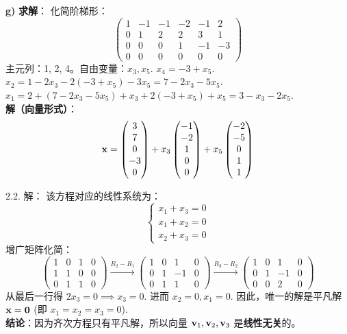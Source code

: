 \begin{exer}
\textbf{g)}
\textbf{求解}：
化简阶梯形：
$$ \left(\begin{array}{ccccc|c} 1 & -1 & -1 & -2 & -1 & 2 \\ 0 & 1 & 2 & 2 & 3 & 1 \\ 0 & 0 & 0 & 1 & -1 & -3 \\ 0 & 0 & 0 & 0 & 0 & 0 \end{array}\right) $$
主元列：1, 2, 4。自由变量：$x_3, x_5$.
$x_4 = -3 + x_5$.
$x_2 = 1 - 2x_3 - 2(-3+x_5) - 3x_5 = 7 - 2x_3 - 5x_5$.
$x_1 = 2 + (7-2x_3-5x_5) + x_3 + 2(-3+x_5) + x_5 = 3 - x_3 - 2x_5$.
\\
\textbf{解（向量形式）}：
$$ \mathbf{x} = \begin{pmatrix} 3 \\ 7 \\ 0 \\ -3 \\ 0 \end{pmatrix} + x_3 \begin{pmatrix} -1 \\ -2 \\ 1 \\ 0 \\ 0 \end{pmatrix} + x_5 \begin{pmatrix} -2 \\ -5 \\ 0 \\ 1 \\ 1 \end{pmatrix} $$

2.2. 解：
该方程对应的线性系统为：
$$ \begin{cases} x_1 + x_3 = 0 \\ x_1 + x_2 = 0 \\ x_2 + x_3 = 0 \end{cases} $$
增广矩阵化简：
$$ \left(\begin{array}{ccc|c} 1 & 0 & 1 & 0 \\ 1 & 1 & 0 & 0 \\ 0 & 1 & 1 & 0 \end{array}\right) \xrightarrow{R_2-R_1} \left(\begin{array}{ccc|c} 1 & 0 & 1 & 0 \\ 0 & 1 & -1 & 0 \\ 0 & 1 & 1 & 0 \end{array}\right) \xrightarrow{R_3-R_2} \left(\begin{array}{ccc|c} 1 & 0 & 1 & 0 \\ 0 & 1 & -1 & 0 \\ 0 & 0 & 2 & 0 \end{array}\right) $$
从最后一行得 $2x_3 = 0 \implies x_3 = 0$.
进而 $x_2 = 0, x_1 = 0$.
因此，唯一的解是平凡解 $\mathbf{x} = \mathbf{0}$ (即 $x_1=x_2=x_3=0$).
\\
\textbf{结论}：因为齐次方程只有平凡解，所以向量 $\mathbf{v}_1, \mathbf{v}_2, \mathbf{v}_3$ 是\textbf{线性无关}的。



\end{exer}
